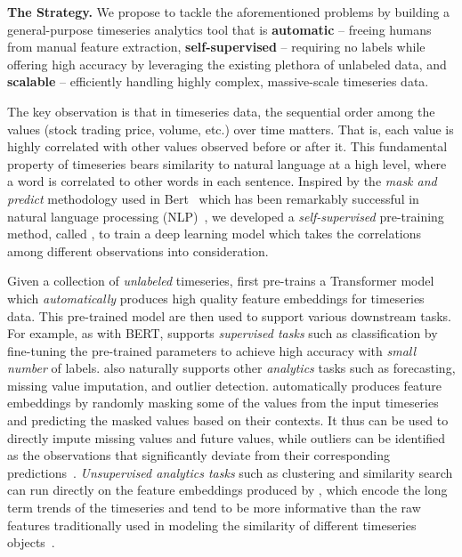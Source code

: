 \noindent\textbf{The \system Strategy.} 
We propose to tackle the aforementioned problems by building a general-purpose timeseries analytics tool that is {\bf automatic} -- freeing humans from manual feature extraction, {\bf self-supervised} -- requiring no labels while offering high accuracy by leveraging the existing plethora of unlabeled data, and {\bf scalable} -- efficiently handling highly complex, massive-scale timeseries data. 

The key observation is that in timeseries data, the sequential order among the values (stock trading price, volume, etc.) over time matters. That is, each value is highly correlated with other values observed before or after it. 
This fundamental property of timeseries bears similarity to natural language at a high level, where a word is correlated to other words in each sentence.  
Inspired by the {\it mask and predict} methodology used in Bert~\cite{DBLP:conf/naacl/DevlinCLT19} which has been remarkably successful in natural language processing (NLP)~\cite{DBLP:conf/naacl/DevlinCLT19}, we developed a {\it self-supervised} pre-training method, called \system, to train a deep learning model which takes the correlations among different observations into consideration. 

Given a collection of {\it unlabeled} timeseries, \system first pre-trains a Transformer model which {\it automatically} produces high quality feature embeddings for timeseries data. This pre-trained model are then used to support various downstream tasks. For example, as with BERT, \system supports {\it supervised tasks} such as classification by fine-tuning the pre-trained parameters to achieve high accuracy with {\it small number} of labels.
\system also naturally supports other {\it analytics} tasks such as forecasting, missing value imputation, and outlier detection. \system automatically produces feature embeddings by randomly masking some of the values from the input timeseries and predicting the masked values based on their contexts. It thus can be used to directly impute missing values and future values, while outliers can be identified as the observations that significantly deviate from their corresponding predictions~\cite{10.1007/978-3-030-77964-1_17}. {\it Unsupervised analytics tasks} such as clustering and similarity search can run directly on the feature embeddings produced by \system, which encode the long term trends of the timeseries and tend to be more informative than the raw features traditionally used in modeling the similarity of different timeseries objects~\cite{DBLP:conf/kdd/WangP21}.

